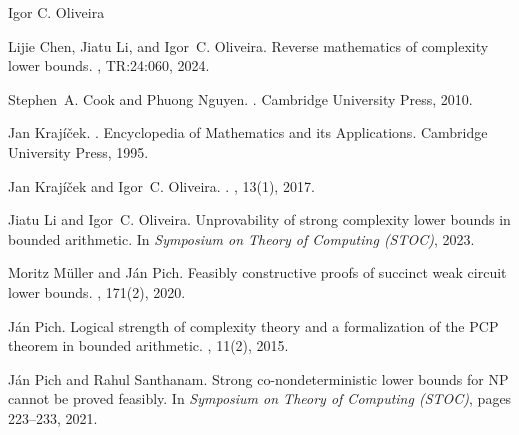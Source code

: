 \documentclass[report]{owrart}
\begin{document}
\begin{report}
\begin{talk}{Igor C. Oliveira}
\begin{thebibliography}{99}
        Lijie Chen, Jiatu Li, and Igor~C. Oliveira.
        \newblock Reverse mathematics of complexity lower bounds.
        , TR:24:060, 2024.
        
        Stephen~A. Cook and Phuong Nguyen.
        .
        \newblock Cambridge University Press, 2010.
        
        Jan Kraj{\'{i}}{\v{c}}ek.
        .
        \newblock Encyclopedia of Mathematics and its Applications. Cambridge
          University Press, 1995.
        
        Jan Kraj{\'{i}}{\v{c}}ek and Igor~C. Oliveira.
        .
        , 13(1), 2017.
        
        Jiatu Li and Igor~C. Oliveira.
        \newblock Unprovability of strong complexity lower bounds in bounded
          arithmetic.
        \newblock In {\em Symposium on Theory of Computing \emph{(STOC)}}, 2023.
        
        Moritz M{\"{u}}ller and J{\'{a}}n Pich.
        \newblock Feasibly constructive proofs of succinct weak circuit lower bounds.
        , 171(2), 2020.
        
        J{\'{a}}n Pich.
        \newblock Logical strength of complexity theory and a formalization of the
          {PCP} theorem in bounded arithmetic.
        , 11(2), 2015.
        
        J{\'{a}}n Pich and Rahul Santhanam.
        \newblock Strong co-nondeterministic lower bounds for {NP} cannot be proved
          feasibly.
        \newblock In {\em Symposium on Theory of Computing \emph{(STOC)}}, pages
          223--233, 2021.
    
    \end{thebibliography}
    
    \end{talk}


\end{report}
\end{document}
